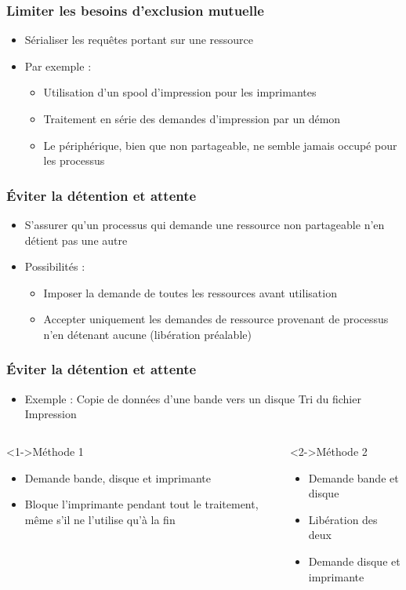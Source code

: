 \begin{frame}
\frametitle{Limiter les besoins d’exclusion mutuelle}
\begin{itemize}
\item Sérialiser les requêtes portant sur une ressource
\item Par exemple :
\begin{itemize}
\item Utilisation d’un spool d’impression pour les imprimantes
\item Traitement en série des demandes d’impression par un démon
\item Le périphérique, bien que non partageable, ne semble jamais occupé pour les processus
\end{itemize}
\end{itemize}
\end{frame}

\begin{frame}
\frametitle{Éviter la détention et attente}
\begin{itemize}
\item S’assurer qu’un processus qui demande une ressource non partageable n’en détient pas une autre
\item Possibilités :
\begin{itemize}
\item Imposer la demande de toutes les ressources avant utilisation
\item Accepter uniquement les demandes de ressource provenant de processus n’en détenant aucune (libération préalable)
\end{itemize}
\end{itemize}
\end{frame}

\begin{frame}
\frametitle{Éviter la détention et attente}
\begin{itemize}
\item Exemple :
Copie de données d’une bande vers un disque
Tri du fichier
Impression
\end{itemize}
\begin{columns}
\begin{block}<1->{Méthode 1}
\begin{itemize}
\item Demande bande, disque et imprimante
\item Bloque l’imprimante pendant tout le traitement, même s’il ne l’utilise qu’à la fin
\end{itemize}
\end{block}
\begin{block}<2->{Méthode 2}
\begin{itemize}
\item Demande bande et disque
\item Libération des deux
\item Demande disque et imprimante
\end{itemize}
\end{block}
\end{columns}
\end{frame}

